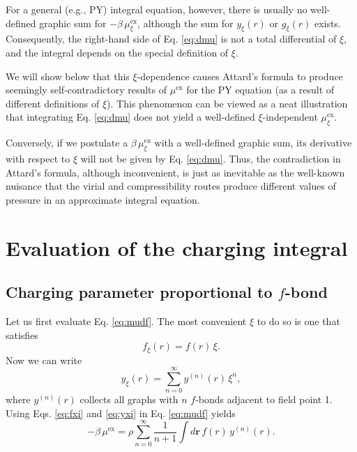 \documentclass[notitlepage, preprint]{revtex4-1}
\newcommand{\vct}[1]{\mathbf{#1}}
\providecommand{\vr}{} %
\renewcommand{\vr}{\vct{r}}
\newcommand{\supex}[1]{ { { #1 }^{ \mathrm{ex} } } }
\newcommand{\muex}{\supex{\mu}}
\newcommand{\muexxi}{\mu^{ \mathrm{ex} }_\xi}
\begin{document}
For a general (e.g., PY) integral equation, however,
there is usually no well-defined graphic sum for
$-\beta \, \muexxi$,
although the sum for $y_\xi(r)$ or $g_\xi(r)$ exists.
%
Consequently,
the right-hand side of Eq. \eqref{eq:dmu}
is not a total differential of $\xi$,
and the integral
depends on the special definition of $\xi$.




We will show below that this $\xi$-dependence
causes Attard's formula\cite{attard1991}
to produce seemingly self-contradictory results of $\muex$
for the PY equation
(as a result of different definitions of $\xi$).
%
This phenomenon can be viewed as a neat illustration that
integrating Eq. \eqref{eq:dmu} does not yield a well-defined $\xi$-independent $\muexxi$.



Conversely,
if we postulate a $\beta \, \muexxi$ with a well-defined graphic sum,
its derivative with respect to $\xi$
will not be given by Eq. \eqref{eq:dmu}.
%
Thus, the contradiction in Attard's formula,
although inconvenient, is just as inevitable as
the well-known nuisance that the virial and compressibility routes
produce different values of pressure
in an approximate integral equation.





\section{Evaluation of the charging integral}



\subsection{Charging parameter proportional to $f$-bond}



Let us first evaluate Eq. \eqref{eq:mudf}.
%
The most convenient $\xi$ to do so is one that satisfies
\begin{equation}
  f_\xi(r) = f(r) \, \xi.
  \label{eq:fxi}
\end{equation}
Now we can write
\begin{equation}
  y_\xi(r) = \sum_{n = 0}^\infty y^{(n)}(r) \, \xi^n,
\label{eq:yxi}
\end{equation}
where $y^{(n)}(r)$ collects all graphs
with $n$ $f$-bonds adjacent to field point 1.
%
Using Eqs. \eqref{eq:fxi} and \eqref{eq:yxi} in Eq. \eqref{eq:mudf} yields
\begin{equation}
  -\beta \, \muex
=
  \rho \sum_{n = 0}^\infty
  \frac{1}{n+1}
  \int d\vr \, f(r) \, y^{(n)}(r).
\label{eq:mu_fyseries}
\end{equation}
\end{document}
